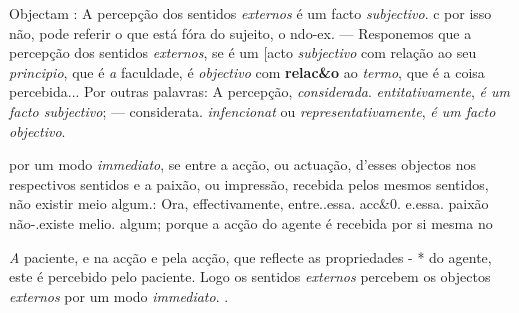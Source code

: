 Objectam : A percepção dos sentidos \emph{externos} é um facto \emph{subjectivo}. c por isso não, pode referir o que está fóra do sujeito, o ndo-ex. --- Responemos que a percepção dos sentidos \emph{externos}, se é um [acto \emph{subjectivo} com relação ao seu \emph{principio}, que é \emph{a} faculdade, é \emph{objectivo} com \textbf{relac\&o} ao \emph{termo}, que é a coisa percebida... Por outras palavras: A percepção, \emph{considerada}. \emph{entitativamente}, \emph{é um facto subjectivo}; --- considerata. \emph{infencionat} ou \emph{representativamente}, \emph{é um facto objectivo}.

por um modo \emph{immediato}, se entre a acção, ou actuação, d'esses objectos nos respectivos sentidos e a paixão, ou impressão, recebida pelos mesmos sentidos, não existir meio algum.: Ora, effectivamente, entre..essa. acc\&0. e.essa. paixão não-.existe melio. algum; porque a acção do agente é recebida por si mesma no

\emph{A} paciente, e na acção e pela acção, que reflecte as propriedades - * do agente, este é percebido pelo paciente. Logo os sentidos \emph{externos} percebem os objectos \emph{externos} por um modo \emph{immediato}. .

